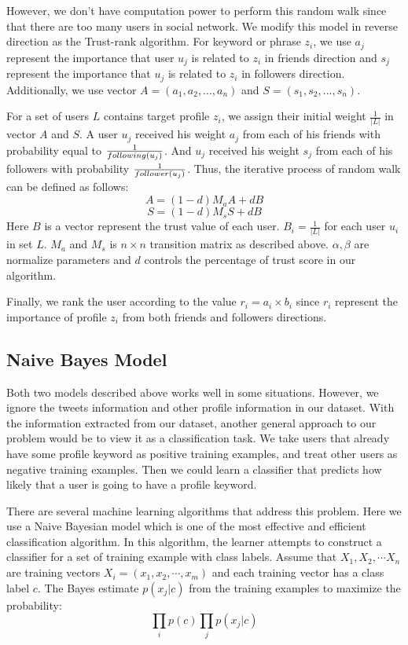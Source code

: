 \documentclass{article}
\begin{document}
However, we don't have computation power to perform this random walk since that there are too many users in social network. We modify this model in reverse direction as the Trust-rank algorithm. For keyword or phrase $z_i$, we use $a_j$ represent the importance that user $u_j$ is related to $z_i$ in friends direction and $s_j$ represent the importance that $u_j$ is related to $z_i$ in followers direction. Additionally, we use vector $A=(a_1, a_2, ..., a_n)$ and $S=(s_1, s_2, ..., s_n)$.

For a set of users $L$ contains target profile $z_i$, we assign their initial weight $\frac{1}{|L|}$ in vector $A$ and $S$. A user $u_j$ received his weight $a_j$ from each of his friends with probability equal to $\frac{1}{following(u_j)}$. And $u_j$ received his weight $s_j$ from each of his followers with probability $\frac{1}{follower(u_j)}$. Thus, the iterative process of random walk can be defined as follows:
$$A = (1 - d) M_a A + d B$$
$$S = (1 - d) M_s S + d B$$
Here $B$ is a vector represent the trust value of each user. $B_i = \frac{1}{|L|}$ for each user $u_i$ in set $L$. $M_a$ and $M_s$ is $n \times n$ transition matrix as described above. $\alpha, \beta$ are normalize parameters and $d$ controls the percentage of trust score in our algorithm.

Finally, we rank the user according to the value $r_i=a_i \times b_i$ since $r_i$ represent the importance of profile $z_i$ from both friends and followers directions.

\subsection{Naive Bayes Model}
Both two models described above works well in some situations. However, we ignore the tweets information and other profile information in our dataset. With the information extracted from our dataset, another general approach to our problem would be to view it as a classification task. We take users that already have some profile keyword as positive training examples, and treat other users as negative training examples. Then we could learn a classifier that predicts how likely that a user is going to have a profile keyword.

There are several machine learning algorithms that address this problem. Here we use a Naive Bayesian model which is one of the most effective and efficient classification algorithm. In this algorithm, the learner attempts to construct a classifier for a set of training example with class labels. Assume that $X_1, X_2, \cdots X_n$ are training vectors $X_i=(x_1, x_2, \cdots, x_m)$ and each training vector has a class label $c$. The Bayes estimate $p(x_j|c)$ from the training examples to maximize the probability:
$$\prod_i p(c)\prod_jp(x_j|c)$$
\end{document}
